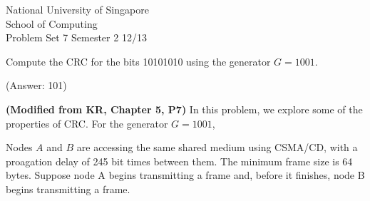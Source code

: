 \documentclass[a4paper,11pt,answers]{exam}
\begin{document}
    \extraheadheight{.5in}
    {\large\sf National University of Singapore\\ School of Computing \\
    \LARGE\sf Problem Set 7}%
    {\large\sf Semester 2 12/13}
    \firstpageheadrule
    \pagestyle{headandfoot}

    \begin{questions}
	\question 
	Compute the CRC for the bits 10101010 using the generator $G = 1001$.
	
	(Answer: 101)

	\question \textbf{(Modified from KR, Chapter 5, P7)}
	In this problem, we explore some of the properties of CRC.  
	For the generator $G = 1001$,

	\question 
	Nodes $A$ and $B$ are accessing the same shared medium using CSMA/CD, 
	with a proagation delay of 245 bit times between them.  The minimum 
	frame size is 64 bytes.  Suppose node A begins transmitting a frame 
	and, before it finishes, node B begins transmitting a frame.  



\end{questions}
\end{document}
